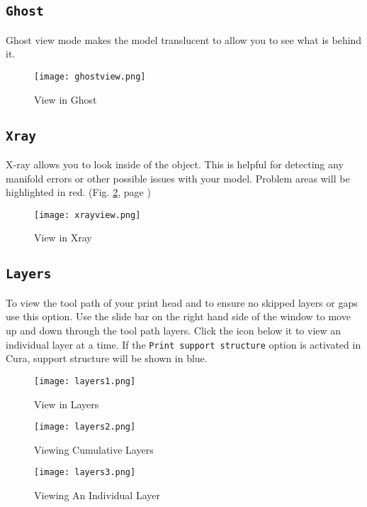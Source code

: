 \subsection{\texttt{Ghost}}
Ghost view mode makes the model translucent to allow you to see what is behind it.
\begin{figure}[H]
\centering
\texttt{[image: ghostview.png]}
\caption{View in Ghost}
\label{fig:Ghost View}
\end{figure}

\subsection{\texttt{Xray}}
X-ray allows you to look inside of the object. This is helpful for detecting any manifold errors or other possible issues with your model. Problem areas will be highlighted in red. (Fig. \ref{fig:Xray View}, page \pageref{fig:Xray View})
\begin{figure}[H]
\centering
\texttt{[image: xrayview.png]}
\caption{View in Xray}
\label{fig:Xray View}
\end{figure}

\subsection{\texttt{Layers}}
To view the tool path of your print head and to ensure no skipped layers or gaps use this option. Use the slide bar on the right hand side of the window to move up and down through the tool path layers. Click the icon below it to view an individual layer at a time. If the \texttt{Print support structure} option is activated in Cura, support structure will be shown in blue.
\begin{figure}[H]
\centering
\texttt{[image: layers1.png]}
\caption{View in Layers}
\label{fig:Layers View}
\end{figure}

\begin{figure}[H]
\centering
\texttt{[image: layers2.png]}
\caption{Viewing Cumulative Layers}
\label{fig:Mid Layers View}
\end{figure}

\begin{figure}[H]
\centering
\texttt{[image: layers3.png]}
\caption{Viewing An Individual Layer}
\label{fig:Specific Layer}
\end{figure}


